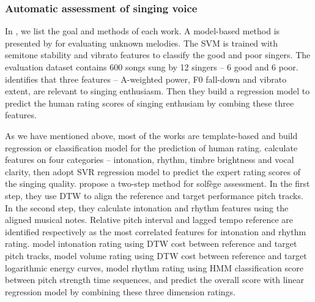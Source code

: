 \subsubsection{Automatic assessment of singing voice}
In , we list the goal and methods of each work. A model-based method is presented by  for evaluating unknown melodies. The SVM is trained with semitone stability and vibrato features to classify the good and poor singers. The evaluation dataset contains 600 songs sung by 12 singers -- 6 good and 6 poor.  identifies that three features -- A-weighted power, F0 fall-down and vibrato extent, are relevant to singing enthusiasm. Then they build a regression model to predict the human rating scores of singing enthusiam by combing these three features.

As we have mentioned above, most of the works are template-based and build regression or classification model for the prediction of human rating.  calculate features on four categories -- intonation, rhythm, timbre brightness and vocal clarity, then adopt SVR regression model to predict the expert rating scores of the singing quality.  propose a two-step method for solfège assessment. In the first step, they use DTW to align the reference and target performance pitch tracks. In the second step, they calculate intonation and rhythm features using the aligned musical notes. Relative pitch interval and lagged tempo reference are identified respectively as the most correlated features for intonation and rhythm rating.  model intonation rating using DTW cost between reference and target pitch tracks, model volume rating using DTW cost between reference and target logarithmic energy curves, model rhythm rating using HMM classification score between pitch strength time sequences, and predict the overall score with linear regression model by combining these three dimension ratings. 

